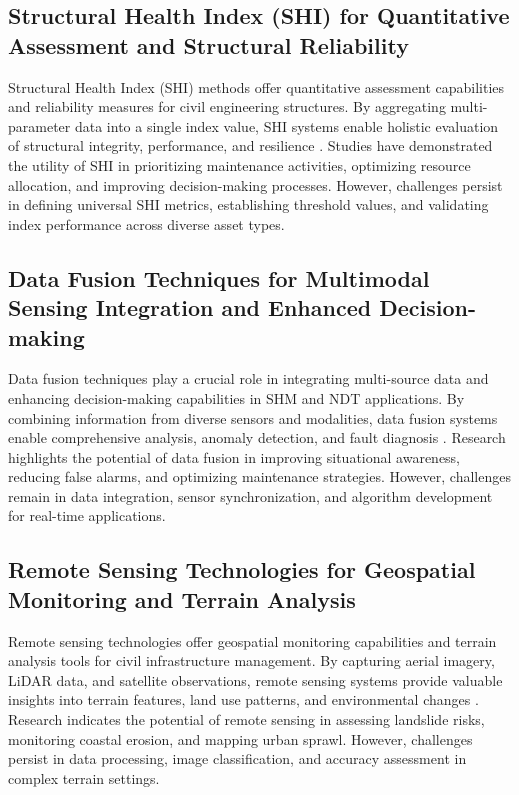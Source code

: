 \documentclass[journal, a4paper]{IEEEtran}
\begin{document}
\subsection{Structural Health Index (SHI) for Quantitative Assessment and Structural Reliability}
Structural Health Index (SHI) methods offer quantitative assessment capabilities and reliability measures for civil
engineering structures. By aggregating multi-parameter data into a single index value, SHI systems enable holistic evaluation
of structural integrity, performance, and resilience \cite{rufai_cure_2020} \cite{pachon_evaluation_2020} \cite{zima_damage_2021}. Studies have demonstrated the utility of SHI
in prioritizing maintenance activities, optimizing resource allocation, and improving decision-making processes.
However, challenges persist in defining universal SHI metrics, establishing threshold values,
and validating index performance across diverse asset types. 

\subsection{Data Fusion Techniques for Multimodal Sensing Integration and Enhanced Decision-making}
Data fusion techniques play a crucial role in integrating multi-source data and enhancing decision-making
capabilities in SHM and NDT applications. By combining information from diverse sensors and modalities, data fusion
systems enable comprehensive analysis, anomaly detection, and fault diagnosis \cite{willmann_health_2023} \cite{zhang_structural_2021} \cite{bevan_automated_2022}.
Research highlights the potential of data fusion in improving situational awareness, reducing false alarms,
and optimizing maintenance strategies. However, challenges remain in data integration, sensor synchronization,
and algorithm development for real-time applications. 

\subsection{Remote Sensing Technologies for Geospatial Monitoring and Terrain Analysis}
Remote sensing technologies offer geospatial monitoring capabilities and terrain analysis tools for civil
infrastructure management. By capturing aerial imagery, LiDAR data, and satellite observations,
remote sensing systems provide valuable insights into terrain features, land use patterns, and environmental changes
\cite{tang_explainable_2023} \cite{fang_structural_2024} \cite{wang_fatigue_2023}. Research indicates the potential of remote sensing in assessing landslide risks,
monitoring coastal erosion, and mapping urban sprawl. However, challenges persist in data processing,
image classification, and accuracy assessment in complex terrain settings.
\end{document}
